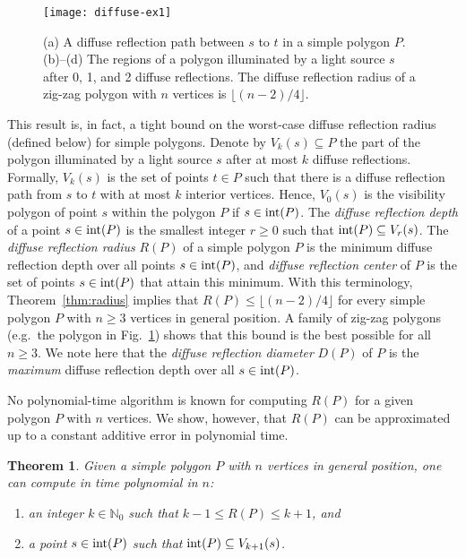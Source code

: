 \documentclass[12pt]{article}
\newcommand{\floor}[1]{{\lfloor #1 \rfloor}}
\newtheorem{theorem}{Theorem}
\begin{document}
\begin{figure}[htb]
\centering
\texttt{[image: diffuse-ex1]}
\caption{(a) A diffuse reflection path between $s$ to $t$ in a simple polygon $P$. (b)--(d) The regions of a polygon illuminated by a light source $s$ after 0, 1, and 2 diffuse reflections. The diffuse reflection radius of a zig-zag polygon with $n$ vertices is $\floor{(n-2)/4}$.}
\label{fig:diffuse-ex1}
\end{figure}

This result is, in fact, a tight bound on the worst-case diffuse reflection radius (defined below) for simple polygons.
Denote by $V_k(s)\subseteq P$ the part of the polygon illuminated by a light source $s$ after at most $k$ diffuse reflections. Formally, $V_k(s)$ is the set of points $t\in P$ such that there is a diffuse reflection path from $s$ to $t$ with at most $k$ interior vertices. Hence, $V_0(s)$ is the visibility polygon of point $s$ within the polygon $P$ if $s\in {\rm int}(P)$. The \emph{diffuse reflection depth} of a point $s\in {\rm int}(P)$ is the smallest integer $r\geq 0$ such that ${\rm int}(P)\subseteq V_r(s)$. The \emph{diffuse reflection radius} $R(P)$ of a simple polygon $P$ is the minimum diffuse reflection depth over all points $s\in {\rm int}(P)$, and \emph{diffuse reflection center} of $P$ is the set of points $s\in {\rm int}(P)$ that attain this minimum. With this terminology, Theorem~\ref{thm:radius} implies that $R(P)\leq \floor{(n-2)/4}$ for every simple polygon $P$ with $n\geq 3$ vertices in general position. A family of zig-zag polygons (e.g.\ the polygon in Fig.~\ref{fig:diffuse-ex1}) shows that this bound is the best possible for all $n\geq 3$. We note here that the \emph{diffuse reflection diameter} $D(P)$ of $P$ is the \emph{maximum} diffuse reflection depth over all $s\in {\rm int}(P)$.

No polynomial-time algorithm is known for computing $R(P)$ for a given polygon $P$ with $n$ vertices. We show, however, that $R(P)$ can be approximated up to a constant additive error in polynomial time.
\begin{theorem}\label{thm:apx-compute-radius}
 Given a simple polygon $P$ with $n$ vertices in general position,
 one can compute in time polynomial in $n$:
\begin{enumerate}
\item an integer $k\in \mathbb{N}_0$ such that $k-1\leq R(P)\leq k+1$, and
\item a point $s\in {\rm int}(P)$ such that ${\rm int}(P)\subseteq V_{k+1}(s)$.
\end{enumerate}
\end{theorem}
\end{document}
